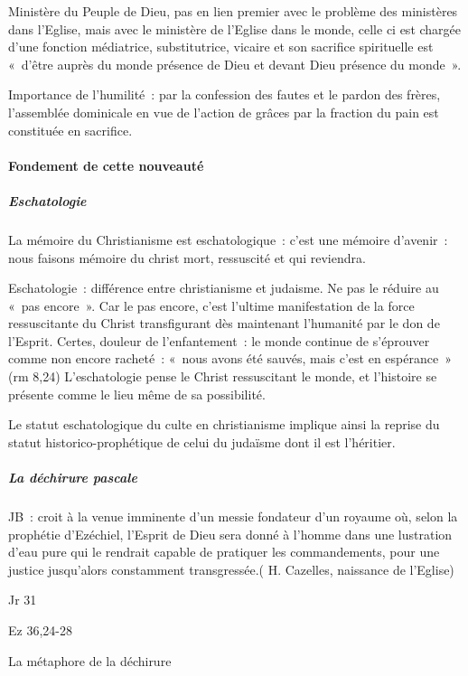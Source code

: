 Ministère du Peuple de Dieu, pas en lien premier avec le problème des
ministères dans l'Eglise, mais avec le ministère de l'Eglise dans le
monde, celle ci est chargée d'une fonction médiatrice, substitutrice,
vicaire et son sacrifice spirituelle est «~d'être auprès du monde
présence de Dieu et devant Dieu présence du monde~».

Importance de l'humilité~: par la confession des fautes et le pardon des
frères, l'assemblée dominicale en vue de l'action de grâces par la
fraction du pain est constituée en sacrifice.

\hypertarget{b.-fondement-de-cette-nouveautuxe9}{%
\paragraph{Fondement de cette
nouveauté}\label{b.-fondement-de-cette-nouveautuxe9}}

\hypertarget{eschatologie}{%
\subparagraph{Eschatologie}\label{eschatologie}}

La mémoire du Christianisme est eschatologique~: c'est une mémoire
d'avenir~: nous faisons mémoire du christ mort, ressuscité et qui
reviendra.

Eschatologie~: différence entre christianisme et judaisme. Ne pas le
réduire au «~pas encore~». Car le pas encore, c'est l'ultime
manifestation de la force ressuscitante du Christ transfigurant dès
maintenant l'humanité par le don de l'Esprit. Certes, douleur de
l'enfantement~: le monde continue de s'éprouver comme non encore
racheté~: «~nous avons été sauvés, mais c'est en espérance~» (rm 8,24)
L'eschatologie pense le Christ ressuscitant le monde, et l'histoire se
présente comme le lieu même de sa possibilité.

Le statut eschatologique du culte en christianisme implique ainsi la
reprise du statut historico-prophétique de celui du judaïsme dont il est
l'héritier.

\hypertarget{la-duxe9chirure-pascale}{%
\subparagraph{La déchirure pascale}\label{la-duxe9chirure-pascale}}

JB~: croit à la venue imminente d'un messie fondateur d'un royaume où,
selon la prophétie d'Ezéchiel, l'Esprit de Dieu sera donné à l'homme
dans une lustration d'eau pure qui le rendrait capable de pratiquer les
commandements, pour une justice jusqu'alors constamment transgressée.(
H. Cazelles, naissance de l'Eglise)

Jr 31

Ez 36,24-28

La métaphore de la déchirure

